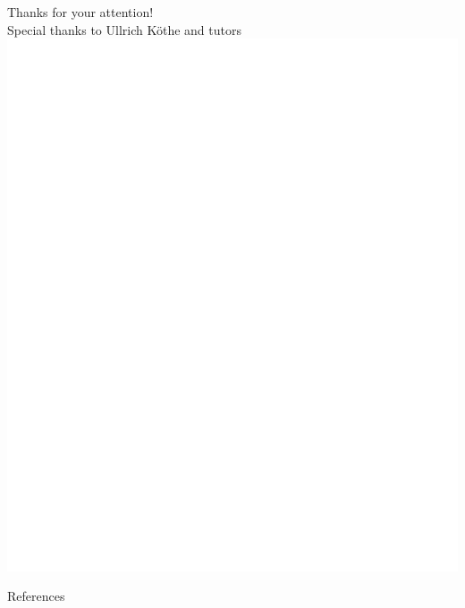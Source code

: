 \documentclass{beamer}
\begin{document}
\begin{frame}[focus]
	Thanks for your attention!\\[0.2em]
	\small Special thanks to Ullrich Köthe and tutors\\[1.5em]
	\includegraphics[scale=0.27]{xkcd.pdf}
\end{frame}

\appendix
\begin{frame}{References}
	\nocite{*}
	
	
\end{frame}
\end{document}
